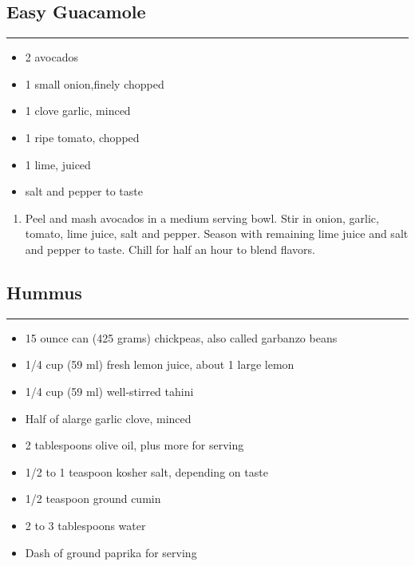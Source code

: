 \documentclass{article}
\begin{document}
\subsection{Easy Guacamole} 
\noindent\rule[0.5ex]{\linewidth}{1pt}

\begin{framed}
    \begin{itemize}
        \item 2 avocados
        \item 1 small onion,finely chopped
        \item 1 clove garlic, minced
        \item 1 ripe tomato, chopped
        \item 1 lime, juiced
        \item salt and pepper to taste
    \end{itemize}
\end{framed}

\begin{enumerate}
    \item 
        Peel and mash avocados in a medium serving bowl. Stir in onion, garlic, tomato, lime juice, salt and pepper. Season with remaining lime juice and salt and pepper to taste. Chill for half an hour to blend flavors.
\end{enumerate}
\newpage

\subsection{Hummus} 
\noindent\rule[0.5ex]{\linewidth}{1pt}

\begin{framed}
    \begin{itemize}
        \item 15 ounce can (425 grams) chickpeas, also called garbanzo beans
        \item 1/4 cup (59 ml) fresh lemon juice, about 1 large lemon
        \item 1/4 cup (59 ml) well-stirred tahini
        \item Half of alarge garlic clove, minced
        \item 2 tablespoons olive oil, plus more for serving
        \item 1/2 to 1 teaspoon kosher salt, depending on taste
        \item 1/2 teaspoon ground cumin
        \item 2 to 3 tablespoons water
        \item Dash of ground paprika for serving
    \end{itemize}
\end{framed}
\end{document}
